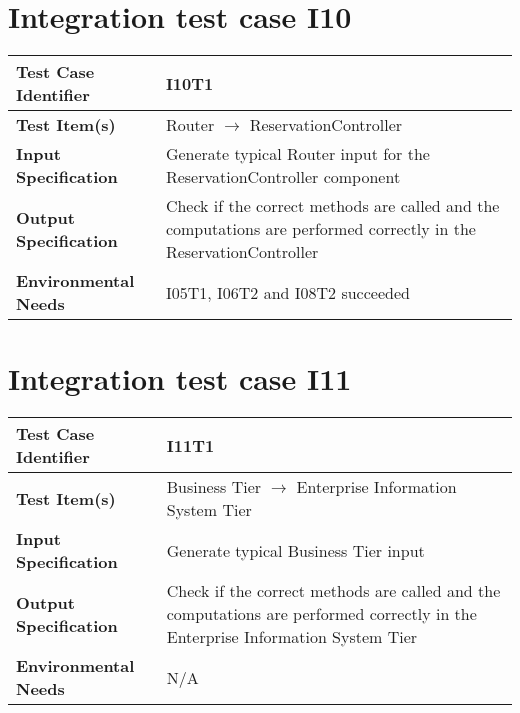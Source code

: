\section{Integration test case I10}\label{I10}
\begin{center}
	\vspace{0.6cm}
	\begin{tabular}{|l|p{10cm}|}
		\hline
		\textbf{Test Case Identifier} & I10T1 \bigstrut \\\hline
		\textbf{Test Item(s)} & Router \ensuremath{\rightarrow} ReservationController \bigstrut \\\hline
		\textbf{Input Specification} & Generate typical Router input for the ReservationController component \bigstrut \\\hline
		\textbf{Output Specification} & Check if the correct methods are called and the computations are performed correctly in the ReservationController \bigstrut \\\hline
		\textbf{Environmental Needs} & I05T1, I06T2 and I08T2 succeeded \bigstrut \\\hline
	\end{tabular}
\end{center}


\section{Integration test case I11}\label{I11}
\begin{center}
	\vspace{0.6cm}
	\begin{tabular}{|l|p{10cm}|}
		\hline
		\textbf{Test Case Identifier} & I11T1 \bigstrut \\\hline
		\textbf{Test Item(s)} & Business Tier \ensuremath{\rightarrow} Enterprise Information System Tier \bigstrut \\\hline
		\textbf{Input Specification} & Generate typical Business Tier input \bigstrut \\\hline
		\textbf{Output Specification} & Check if the correct methods are called and the computations are performed correctly in the Enterprise Information System Tier \bigstrut \\\hline
		\textbf{Environmental Needs} & N/A \bigstrut \\\hline
	\end{tabular}
\end{center}

